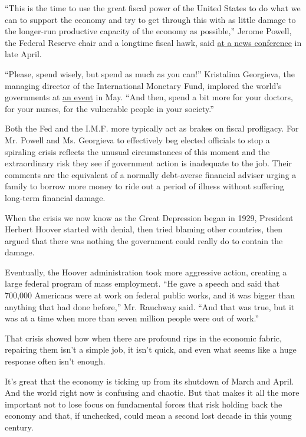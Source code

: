 ``This is the time to use the great fiscal power of the United States to
do what we can to support the economy and try to get through this with
as little damage to the longer-run productive capacity of the economy as
possible,'' Jerome Powell, the Federal Reserve chair and a longtime
fiscal hawk, said
\href{https://www.federalreserve.gov/mediacenter/files/FOMCpresconf20200429.pdf}{at
a news conference} in late April.

``Please, spend wisely, but spend as much as you can!'' Kristalina
Georgieva, the managing director of the International Monetary Fund,
implored the world's governments at
\href{https://www.politico.com/newsletters/politico-nightly-coronavirus-special-edition/2020/05/15/spend-as-much-as-you-can-489240}{an
event} in May. ``And then, spend a bit more for your doctors, for your
nurses, for the vulnerable people in your society.''

Both the Fed and the I.M.F. more typically act as brakes on fiscal
profligacy. For Mr. Powell and Ms. Georgieva to effectively beg elected
officials to stop a spiraling crisis reflects the unusual circumstances
of this moment and the extraordinary risk they see if government action
is inadequate to the job. Their comments are the equivalent of a
normally debt-averse financial adviser urging a family to borrow more
money to ride out a period of illness without suffering long-term
financial damage.

When the crisis we now know as the Great Depression began in 1929,
President Herbert Hoover started with denial, then tried blaming other
countries, then argued that there was nothing the government could
really do to contain the damage.

Eventually, the Hoover administration took more aggressive action,
creating a large federal program of mass employment. ``He gave a speech
and said that 700,000 Americans were at work on federal public works,
and it was bigger than anything that had done before,'' Mr. Rauchway
said. ``And that was true, but it was at a time when more than seven
million people were out of work.''

That crisis showed how when there are profound rips in the economic
fabric, repairing them isn't a simple job, it isn't quick, and even what
seems like a huge response often isn't enough.

It's great that the economy is ticking up from its shutdown of March and
April. And the world right now is confusing and chaotic. But that makes
it all the more important not to lose focus on fundamental forces that
risk holding back the economy and that, if unchecked, could mean a
second lost decade in this young century.

